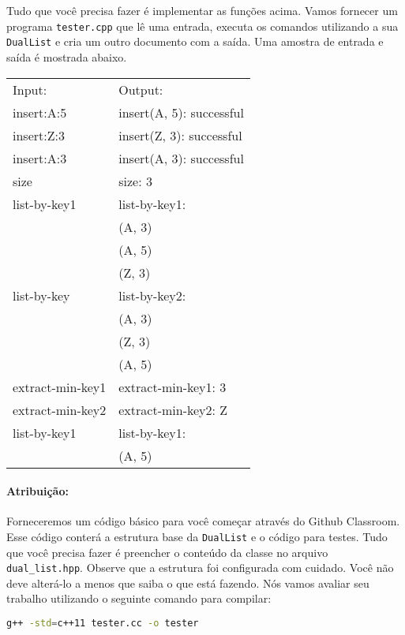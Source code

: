 \documentclass{article}
\begin{document}
Tudo que você precisa fazer é implementar as funções acima. Vamos fornecer um programa \texttt{tester.cpp} que lê uma entrada, executa os comandos utilizando a sua \texttt{DualList} e cria um outro documento com a saída. Uma amostra de entrada e saída é mostrada abaixo.


\begin{table}[h!]
\centering
\begin{tabular}{l|l}
Input:           & Output:                  \\
insert:A:5       & insert(A, 5): successful \\
insert:Z:3       & insert(Z, 3): successful \\
insert:A:3       & insert(A, 3): successful \\
size             & size: 3                  \\
list-by-key1     & list-by-key1:            \\
                 & (A, 3)                   \\
                 & (A, 5)                   \\
                 & (Z, 3)                   \\
list-by-key      & list-by-key2:            \\
                 & (A, 3)                   \\
                 & (Z, 3)                   \\
                 & (A, 5)                   \\
extract-min-key1 & extract-min-key1: 3      \\
extract-min-key2 & extract-min-key2: Z      \\
list-by-key1     & list-by-key1:            \\
                 & (A, 5)                  
\end{tabular}
\vspace{-0.5cm}
\end{table}

\paragraph{Atribuição:} Forneceremos um código básico para você começar através do Github Classroom. Esse código conterá a estrutura base da \texttt{DualList} e o código para testes. Tudo que você precisa fazer é preencher o conteúdo da classe no arquivo \texttt{dual\_list.hpp}. Observe que a estrutura foi configurada com cuidado. Você não deve alterá-lo a menos que saiba o que está fazendo.
%
Nós vamos avaliar seu trabalho utilizando o seguinte comando para compilar:
\begin{lstlisting}[language=bash]
g++ -std=c++11 tester.cc -o tester
\end{lstlisting}
\end{document}

